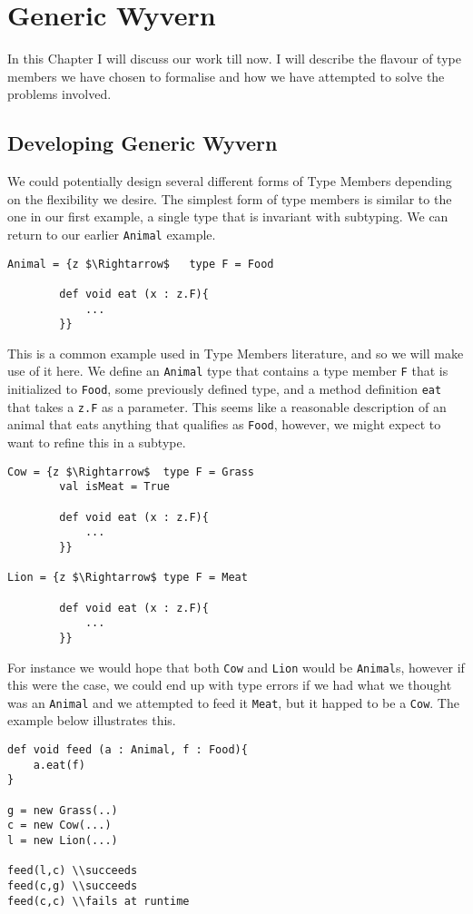 \documentclass[11pt
              , a4paper
              , twoside
              , openright
              ]{report}
\numberwithin{case}{theorem}
\numberwithin{subcase}{case}
\begin{document}
\chapter{Generic Wyvern}\label{ch:wyvern}
In this Chapter I will discuss our work till now. I will describe the flavour of type members we have chosen to formalise and how we have attempted to solve the problems involved.

\section{Developing Generic Wyvern}

We could potentially design several different forms of Type Members depending on the flexibility we desire. The simplest form of type members is similar to the one in our first example, a single type that is invariant with subtyping. We can return to our earlier \verb|Animal| example.
\begin{lstlisting}[mathescape, style=customlang]
Animal = {z $\Rightarrow$	type F = Food
		
		def void eat (x : z.F){
			...
		}}
\end{lstlisting}
This is a common example used in Type Members literature, and so we will make use of it here. We define an \verb|Animal| type that contains a type member \verb|F| that is initialized to \verb|Food|, some previously defined type, and a method definition \verb|eat| that takes a \verb|z.F| as a parameter. This seems like a reasonable description of an animal that eats anything that qualifies as \verb|Food|, however, we might expect to want to refine this in a subtype.
\begin{lstlisting}[mathescape, style=customlang]
Cow = {z $\Rightarrow$	type F = Grass
		val isMeat = True
		
		def void eat (x : z.F){
			...
		}}

Lion = {z $\Rightarrow$	type F = Meat
		
		def void eat (x : z.F){
			...
		}}
\end{lstlisting}
For instance we would hope that both \verb|Cow| and \verb|Lion| would be \verb|Animal|s, however if this were the case, we could end up with type errors if we had what we thought was an \verb|Animal| and we attempted to feed it \verb|Meat|, but it happed to be a \verb|Cow|. The example below illustrates this.
\begin{lstlisting}[mathescape, style=customlang]
def void feed (a : Animal, f : Food){
	a.eat(f)
}

g = new Grass(..)
c = new Cow(...)
l = new Lion(...)

feed(l,c) \\succeeds
feed(c,g) \\succeeds
feed(c,c) \\fails at runtime
\end{lstlisting}
\end{document}
